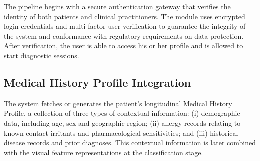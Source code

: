 \documentclass[pdflatex,sn-mathphys-num]{sn-jnl}%
\begin{document}
The pipeline begins with a secure authentication gateway that verifies the identity of both
patients and clinical practitioners. The module uses encrypted login credentials and
multi-factor user verification to guarantee the integrity of the system and conformance with
regulatory requirements on data protection. After verification, the user is able to access
his or her profile and is allowed to start diagnostic sessions.

\subsection{Medical History Profile Integration}

The system fetches or generates the patient's longitudinal Medical History Profile, a
collection of three types of contextual information: (i) demographic data, including age,
sex and geographic region; (ii) allergy records relating to known contact irritants and
pharmacological sensitivities; and (iii) historical disease records and prior diagnoses.
This contextual information is later combined with the visual feature representations at the
classification stage.
\end{document}

